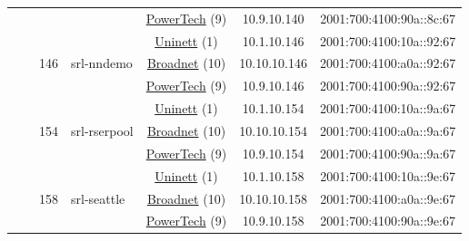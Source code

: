 \begin{small}
\begin{center}
\begin{longtable}{|c|c|c|c|c|c|c|c|}
  &  &  &  & \multicolumn{2}{|c|}{\tiny{\href{http://www.powertech.no}{PowerTech} (9)}} & \tiny{10.9.10.140} & \tiny{2001:700:4100:90a::8c:67} \\* \cline{3-3}\cline{4-4}\cline{5-5}\cline{6-6}\cline{7-7}\cline{8-8}
  &  & \multirow{3}{*}{\tiny{146}} & \multicolumn{1}{|l|}{\multirow{3}{*}{\tiny{srl-nndemo}}} & \multicolumn{2}{|c|}{\tiny{\href{https://www.uninett.no}{Uninett} (1)}} & \tiny{10.1.10.146} & \tiny{2001:700:4100:10a::92:67} \\* \cline{5-5}\cline{6-6}\cline{7-7}\cline{8-8}
  &  &  &  & \multicolumn{2}{|c|}{\tiny{\href{https://www.broadnet.no}{Broadnet} (10)}} & \tiny{10.10.10.146} & \tiny{2001:700:4100:a0a::92:67} \\* \cline{5-5}\cline{6-6}\cline{7-7}\cline{8-8}
  &  &  &  & \multicolumn{2}{|c|}{\tiny{\href{http://www.powertech.no}{PowerTech} (9)}} & \tiny{10.9.10.146} & \tiny{2001:700:4100:90a::92:67} \\* \cline{3-3}\cline{4-4}\cline{5-5}\cline{6-6}\cline{7-7}\cline{8-8}
  &  & \multirow{3}{*}{\tiny{154}} & \multicolumn{1}{|l|}{\multirow{3}{*}{\tiny{srl-rserpool}}} & \multicolumn{2}{|c|}{\tiny{\href{https://www.uninett.no}{Uninett} (1)}} & \tiny{10.1.10.154} & \tiny{2001:700:4100:10a::9a:67} \\* \cline{5-5}\cline{6-6}\cline{7-7}\cline{8-8}
  &  &  &  & \multicolumn{2}{|c|}{\tiny{\href{https://www.broadnet.no}{Broadnet} (10)}} & \tiny{10.10.10.154} & \tiny{2001:700:4100:a0a::9a:67} \\* \cline{5-5}\cline{6-6}\cline{7-7}\cline{8-8}
  &  &  &  & \multicolumn{2}{|c|}{\tiny{\href{http://www.powertech.no}{PowerTech} (9)}} & \tiny{10.9.10.154} & \tiny{2001:700:4100:90a::9a:67} \\* \cline{3-3}\cline{4-4}\cline{5-5}\cline{6-6}\cline{7-7}\cline{8-8}
  &  & \multirow{3}{*}{\tiny{158}} & \multicolumn{1}{|l|}{\multirow{3}{*}{\tiny{srl-seattle}}} & \multicolumn{2}{|c|}{\tiny{\href{https://www.uninett.no}{Uninett} (1)}} & \tiny{10.1.10.158} & \tiny{2001:700:4100:10a::9e:67} \\* \cline{5-5}\cline{6-6}\cline{7-7}\cline{8-8}
  &  &  &  & \multicolumn{2}{|c|}{\tiny{\href{https://www.broadnet.no}{Broadnet} (10)}} & \tiny{10.10.10.158} & \tiny{2001:700:4100:a0a::9e:67} \\* \cline{5-5}\cline{6-6}\cline{7-7}\cline{8-8}
  &  &  &  & \multicolumn{2}{|c|}{\tiny{\href{http://www.powertech.no}{PowerTech} (9)}} & \tiny{10.9.10.158} & \tiny{2001:700:4100:90a::9e:67} \\* \cline{3-3}\cline{4-4}\cline{5-5}\cline{6-6}\cline{7-7}\cline{8-8}

\end{longtable}
\end{center}
\end{small}

